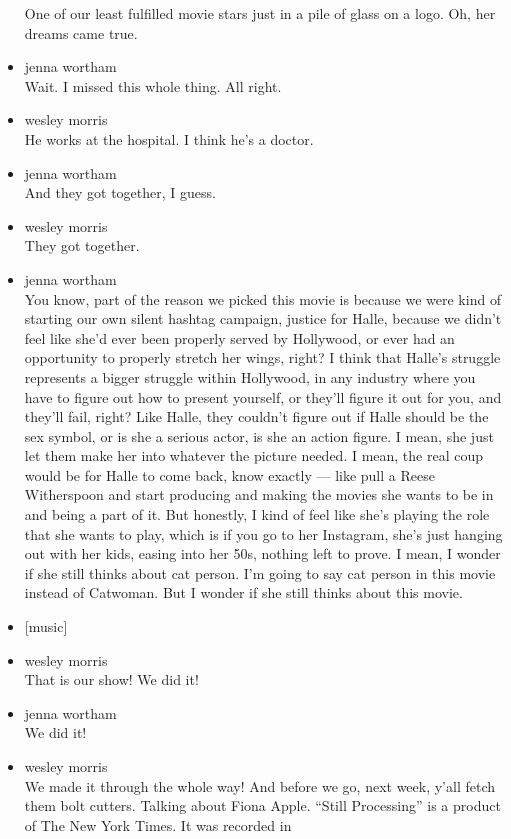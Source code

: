 \begin{itemize}
  One of our least fulfilled movie stars just in a pile of glass on a
  logo. Oh, her dreams came true.
\item
  jenna wortham\\
  Wait. I missed this whole thing. All right.
\item
  wesley morris\\
  He works at the hospital. I think he's a doctor.
\item
  jenna wortham\\
  And they got together, I guess.
\item
  wesley morris\\
  They got together.
\item
  jenna wortham\\
  You know, part of the reason we picked this movie is because we were
  kind of starting our own silent hashtag campaign, justice for Halle,
  because we didn't feel like she'd ever been properly served by
  Hollywood, or ever had an opportunity to properly stretch her wings,
  right? I think that Halle's struggle represents a bigger struggle
  within Hollywood, in any industry where you have to figure out how to
  present yourself, or they'll figure it out for you, and they'll fail,
  right? Like Halle, they couldn't figure out if Halle should be the sex
  symbol, or is she a serious actor, is she an action figure. I mean,
  she just let them make her into whatever the picture needed. I mean,
  the real coup would be for Halle to come back, know exactly --- like
  pull a Reese Witherspoon and start producing and making the movies she
  wants to be in and being a part of it. But honestly, I kind of feel
  like she's playing the role that she wants to play, which is if you go
  to her Instagram, she's just hanging out with her kids, easing into
  her 50s, nothing left to prove. I mean, I wonder if she still thinks
  about cat person. I'm going to say cat person in this movie instead of
  Catwoman. But I wonder if she still thinks about this movie.
\item
  {[}music{]}
\item
  wesley morris\\
  That is our show! We did it!
\item
  jenna wortham\\
  We did it!
\item
  wesley morris\\
  We made it through the whole way! And before we go, next week, y'all
  fetch them bolt cutters. Talking about Fiona Apple. ``Still
  Processing'' is a product of The New York Times. It was recorded in

\end{itemize}

